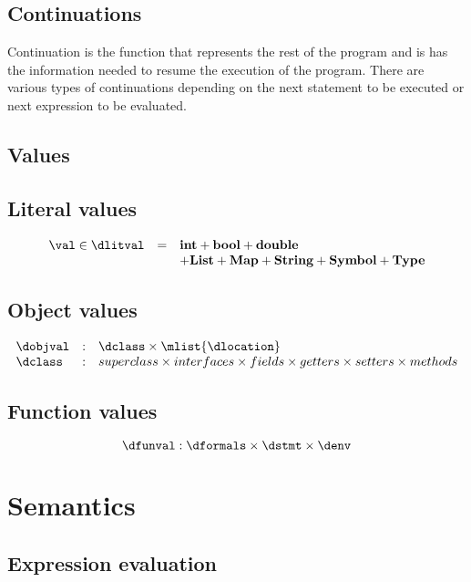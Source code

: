 \documentclass{article}
\begin{document}
\subsection{Continuations}
\label{subsec:continuations-definition}

Continuation is the function that represents the rest of the program and is has the information needed to resume the execution of the program. 
There are various types of continuations depending on the next statement to be executed or next expression to be evaluated.

\subsection{Values}
\label{subsec:values}
\subsection{Literal values}
\label{subsubsec:literal-values}
\[
  \begin{array}{lcl}
	\val \in \dlitval &=& \mathbf{int} + \mathbf{bool} + \mathbf{double}\\
	&& + \mathbf{List} + \mathbf{Map} + \mathbf{String} + \mathbf{Symbol} + \mathbf{Type}
  \end{array}
\]
\subsection{Object values}
\label{subsec:object-values}
\[
  \begin{array}{lcl}
	\dobjval &:& \dclass \times \mlist{\dlocation}\\
	\dclass &:& superclass \times interfaces \times fields \times getters \times setters \times methods
  \end{array}
\]
\subsection{Function values}
\label{subsec:function-values}
\[
	\dfunval : \dformals \times \dstmt \times \denv
\]

\section{Semantics}
\label{sec:semantics}
\subsection{Expression evaluation}
\label{subsec:expr-evaluation}
\end{document}
